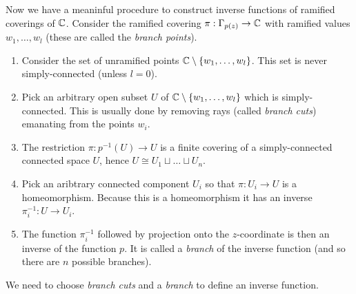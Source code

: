 Now we have a meaninful procedure to construct inverse functions of ramified coverings of $\mathbb{C}$.
Consider the ramified covering $\pi: \Gamma_{p(z)} \rightarrow \mathbb{C}$ with ramified values $w_1, \dots, w_l$ (these are called the \emph{branch points}).
\begin{enumerate}
  \item Consider the set of unramified points $\mathbb{C} \setminus \left\{w_1, \dots, w_l\right\}$. This set is never simply-connected (unless $l = 0$).
  \item Pick an arbitrary open subset $U$ of $\mathbb{C} \setminus \left\{w_1, \dots, w_l\right\}$ which is simply-connected. This is usually done by removing rays (called \emph{branch cuts}) emanating from the points $w_i$.
  \item The restriction $\pi: p^{-1}(U) \rightarrow U$ is a finite covering of a simply-connected connected space $U$, hence $U \cong U_1 \sqcup \dots \sqcup U_n$.
  \item Pick an aribtrary connected component $U_i$ so that $\pi:U_i \rightarrow U$ is a homeomorphism. Because this is a homeomorphism it has an inverse $\pi_i^{-1}: U \rightarrow U_i$.
  \item The function $\pi_i^{-1}$ followed by projection onto the $z$-coordinate is then an inverse of the function $p$. It is called a \emph{branch} of the inverse function (and so there are $n$ possible branches).
\end{enumerate}
We need to choose \emph{branch cuts} and a \emph{branch} to define an inverse function.
\begin{ex}
\end{ex}
